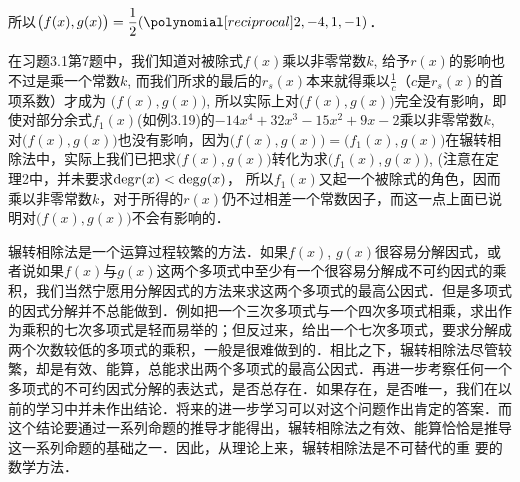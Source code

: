 \begin{solution}
\begin{center}
\end{center}    

所以$\big(f(x),g(x)\big)=\frac{1}{2}(\poly{2,-4,1,-1})$．
\end{solution}

在习题3.1第7题中，我们知道对被除式$f(x)$乘以非零常数$k$, 给予$r(x)$的影响也不过是乘一个常数$k$, 而我们所求的最后的$r_s(x)$本来就得乘以$\frac{1}{c}$（$c$是$r_s(x)$的首项系数）才成为
$\big(f(x),g(x)\big)$, 所以实际上对$\big(f(x),g(x)\big)$完全没有影响，即使对部分余式$f_1(x)$(如例3.19)的$-14x^4+32x^3-15x^2+9x-2$乘以非零常数$k$, 对$\big(f(x),g(x)\big)$也没有影响，因为$\big(f(x),g(x)\big)=\big(f_1(x),g(x)\big)$在辗转相除法中，实际上我们已把求$\big(f(x),g(x)\big)$转化为求$\big(f_1(x),g(x)\big)$, (注意在定理2中，并未要求${\rm deg}r(x)<{\rm deg}g(x)$，
所以$f_1(x)$又起一个被除式的角色，因而乘以非零常数$k$，对于所得的$r(x)$仍不过相差一个常数因子，而这一点上面已说明对$\big(f(x),g(x)\big)$不会有影响的．

辗转相除法是一个运算过程较繁的方法．如果$f(x)$, $g(x)$很容易分解因式，或者说如果$f(x)$与$g(x)$这两个多项式中至少有一个很容易分解成不可约因式的乘积，我们当然宁愿用分解因式的方法来求这两个多项式的最高公因式．但是多项式的因式分解并不总能做到．例如把一个三次多项式与一个四次多项式相乘，求出作为乘积的七次多项式是轻而易举的；但反过来，给出一个七次多项式，要求分解成两个次数较低的多项式的乘积，一般是很难做到的．相比之下，辗转相除法尽管较繁，却是有效、能算，总能求出两个多项式的最高公因式．再进一步考察任何一个多项式的不可约因式分解的表达式，是否总存在．如果存在，是否唯一，我们在以前的学习中并未作出结论．将来的进一步学习可以对这个问题作出肯定的答案．而这个结论要通过一系列命题的推导才能得出，辗转相除法之有效、能算恰恰是推导这一系列命题的基础之一．因此，从理论上来，辗转相除法是不可替代的重
要的数学方法．

